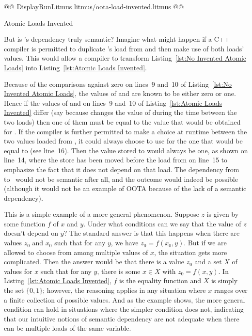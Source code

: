 \documentclass[10]{article}
\begin{document}
\begin{listing}[tbp]
@@ DisplayRunLitmus litmus/oota-load-invented.litmus @@
\caption{Atomic Loads Invented}
\label{lst:Atomic Loads Invented}
\end{listing}

But is 's dependency truly semantic?
Imagine what might happen if a C++ compiler is permitted to
duplicate 's load from  and then make use of both loads'
values.
This would allow a compiler to transform
Listing~\ref{lst:No Invented Atomic Loads}
into
Listing~\ref{lst:Atomic Loads Invented}.

Because of the comparisons against zero on lines~9 and~10 of
Listing~\ref{lst:No Invented Atomic Loads},
the values of  and  are known to be either zero or one.
Hence if the values of  and  on lines~9 and~10 of
Listing~\ref{lst:Atomic Loads Invented}
differ (say because  changes the value of 
during the time between the two loads)
then one of them must be equal to the value that would
be obtained for .
If the compiler is further permitted to make a choice at runtime
between the two values loaded from , it could always choose
to use for  the one that would be equal to  (see line~16).
Then the value stored to  would always be one,
as shown on line~14, where the store has been moved before
the load from  on line~15 to emphasize the fact that
it does not depend on that load.
The dependency from~ to~ would not be semantic after all,
and the outcome  would indeed be possible
(although it would not be an example of OOTA because of the lack of a
semantic dependency).

This is a simple example of a more general phenomenon.
Suppose $z$ is given by some function $f$ of $x$ and $y$.
Under what conditions can we say that the value of $z$ doesn't depend
on $y$?
The standard answer is that this happens when there are values
$z_0$ and $x_0$ such that for any $y$, we have $z_0 = f(x_0, y)$.
But if we are allowed to choose from among multiple values of $x$,
the situation gets more complicated.
Then the answer would be that there is a value $z_0$ and
a set $X$ of values for $x$ such that for any $y$, there is some
$x \in X$ with $z_0 = f(x, y)$.
In Listing~\ref{lst:Atomic Loads Invented},
$f$ is the equality function and $X$ is simply the set $\{0, 1\}$;
however, the reasoning applies in any situation where $x$ ranges
over a finite collection of possible values.
And as the example shows, the more general condition can hold in situations
where the simpler condition does not, indicating that our intuitive
notions of semantic dependency are not adequate when there can be
multiple loads of the same variable.
\end{document}
